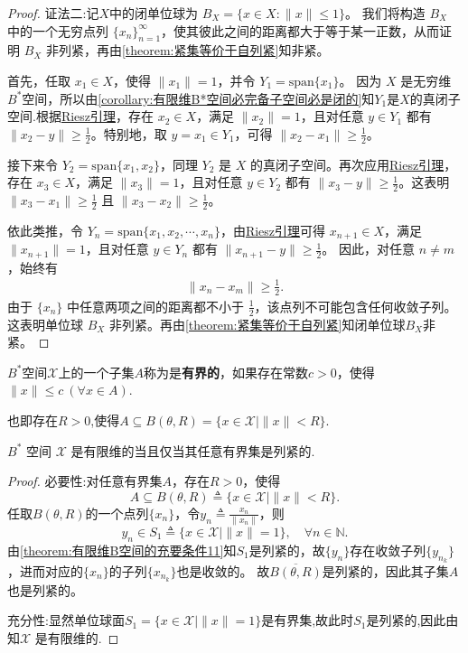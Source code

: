 \documentclass[../../main.tex]{subfiles}%
\begin{document}
\begin{proof}
{\color{blue}证法二:}记$X$中的闭单位球为 \(B_X = \{x \in X : \|x\| \leqslant 1\}\)。
我们将构造 \(B_X\) 中的一个无穷点列 \(\{x_n\}_{n=1}^{\infty}\)，使其彼此之间的距离都大于等于某一正数，从而证明 \(B_X\) 非列紧，再由\cref{theorem:紧集等价于自列紧}知非紧。

首先，任取 \(x_1 \in X\)，使得 \(\|x_1\| = 1\)，并令 \(Y_1 = \text{span}\{x_1\}\)。
因为 \(X\) 是无穷维$B^*$空间，所以由\cref{corollary:有限维B*空间必完备子空间必是闭的}知$Y_1$是$X$的真闭子空间.根据\hyperref[lemma:Riesz引理]{Riesz引理}，存在 \(x_2 \in X\)，满足 \(\|x_2\| = 1\)，且对任意 \(y \in Y_1\) 都有 \(\|x_2 - y\| \geqslant \frac{1}{2}\)。特别地，取 \(y = x_1 \in Y_1\)，可得 \(\|x_2 - x_1\| \geqslant \frac{1}{2}\)。

接下来令 \(Y_2 = \text{span}\{x_1, x_2\}\)，同理 \(Y_2\) 是 \(X\) 的真闭子空间。再次应用\hyperref[lemma:Riesz引理]{Riesz引理}，存在 \(x_3 \in X\)，满足 \(\|x_3\| = 1\)，且对任意 \(y \in Y_2\) 都有 \(\|x_3 - y\| \geqslant \frac{1}{2}\)。这表明 \(\|x_3 - x_1\| \geqslant \frac{1}{2}\) 且 \(\|x_3 - x_2\| \geqslant \frac{1}{2}\)。

依此类推，令 \(Y_n = \text{span}\{x_1, x_2, \cdots, x_n\}\)，由\hyperref[lemma:Riesz引理]{Riesz引理}可得 \(x_{n+1} \in X\)，满足 \(\|x_{n+1}\| = 1\)，且对任意 \(y \in Y_n\) 都有 \(\|x_{n+1} - y\| \geqslant \frac{1}{2}\)。
因此，对任意 \(n \neq m\)，始终有
\begin{align*}
\|x_n - x_m\| \geqslant \frac{1}{2}.
\end{align*}
由于 \(\{x_n\}\) 中任意两项之间的距离都不小于 \(\frac{1}{2}\)，该点列不可能包含任何收敛子列。
这表明单位球 \(B_X\) 非列紧。再由\cref{theorem:紧集等价于自列紧}知闭单位球\(B_X\)非紧。
\end{proof}

\begin{definition}
$B^*$空间$\mathscr{X}$上的一个子集$A$称为是\textbf{有界的}，如果存在常数$c>0$，使得$\|x\| \leqslant c \ (\forall x \in A).$

也即存在$R>0$,使得$A\subseteq B(\theta,R)=\{x\in \mathscr{X}\mid \|x\|< R\}$.
\end{definition}

\begin{corollary}\label{corollary:有限维线性空间等价于任意有界集列紧}
$B^*$ 空间 $\mathscr{X}$ 是有限维的当且仅当其任意有界集是列紧的.
\end{corollary}
\begin{proof}

{\heiti 必要性:}对任意有界集$A$，存在$R>0$，使得$$A\subseteq B(\theta,R)\triangleq\{x\in\mathscr{X}\mid\|x\|< R\}.$$
任取$B(\theta,R)$的一个点列$\{x_n\}$，令$y_n\triangleq\frac{x_n}{\|x_n\|}$，则
$$y_n\in S_1\triangleq\{x\in\mathscr{X}\mid\|x\|=1\},\quad \forall n\in\mathbb{N}.$$
由\cref{theorem:有限维B空间的充要条件11}知$S_1$是列紧的，故$\{y_n\}$存在收敛子列$\{y_{n_k}\}$，进而对应的$\{x_n\}$的子列$\{x_{n_k}\}$也是收敛的。
故$\overline{B(\theta,R)}$是列紧的，因此其子集$A$也是列紧的。

{\heiti 充分性:}显然单位球面$S_1 = \{x \in \mathscr{X} \mid \|x\|=1\}$是有界集,故此时$S_1$是列紧的,因此由知$\mathscr{X}$ 是有限维的.
\end{proof}
\end{document}
